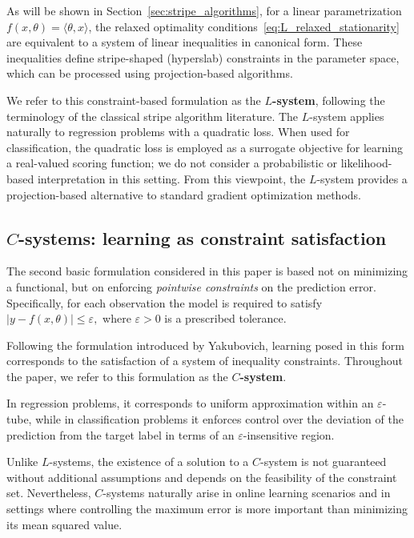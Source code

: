 \documentclass[a4paper,fleqn]{cas-sc}
\begin{document}
As will be shown in Section~\ref{sec:stripe_algorithms}, for a linear parametrization
$f(x,\theta) = \langle \theta, x \rangle$, the relaxed optimality conditions~\eqref{eq:L_relaxed_stationarity} are equivalent to a system of linear inequalities in canonical form.
These inequalities define stripe-shaped (hyperslab) constraints
in the parameter space, which can be processed using projection-based algorithms.


We refer to this constraint-based formulation as the \textbf{$L$-system}, following the terminology of the classical stripe algorithm literature. The $L$-system applies naturally to regression problems with a quadratic loss. When used for classification, the quadratic loss is employed as a surrogate objective for learning a real-valued scoring function; we do not consider a probabilistic or likelihood-based interpretation in this setting. From this viewpoint, the $L$-system provides a projection-based alternative
to standard gradient optimization methods.


\subsection{$C$-systems: learning as constraint satisfaction}


The second basic formulation considered in this paper is based not on minimizing a functional,
but on enforcing \emph{pointwise constraints} on the prediction error. Specifically, for each observation the model is required to satisfy
$
|y - f(x,\theta)| \le \varepsilon,
$
where $\varepsilon>0$ is a prescribed tolerance.

Following the formulation introduced by Yakubovich, learning posed in this form corresponds to the satisfaction of a system of inequality constraints.
Throughout the paper, we refer to this formulation as the \textbf{$C$-system}.


In regression problems, it corresponds to uniform approximation
within an $\varepsilon$-tube,
while in classification problems it enforces control over the deviation
of the prediction from the target label
in terms of an $\varepsilon$-insensitive region.

Unlike $L$-systems, the existence of a solution to a $C$-system
is not guaranteed without additional assumptions
and depends on the feasibility of the constraint set.
Nevertheless, $C$-systems naturally arise in online learning scenarios
and in settings where controlling the maximum error
is more important than minimizing its mean squared value.
\end{document}
